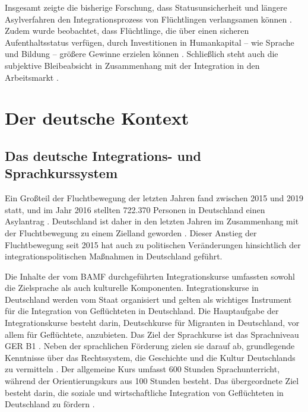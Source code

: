 Insgesamt zeigte die bisherige Forschung, dass Statusunsicherheit und längere Asylverfahren den Integrationsprozess von Flüchtlingen verlangsamen können \parencites{article}{doi:10.1126/sciadv.1600432}. Zudem wurde beobachtet, dass Flüchtlinge, die über einen sicheren Aufenthaltsstatus verfügen, durch Investitionen in Humankapital – wie Sprache und Bildung – größere Gewinne erzielen können \parencite{10.1257/aer.89.2.186}. Schließlich steht auch die subjektive Bleibeabsicht in Zusammenhang mit der Integration in den Arbeitsmarkt \parencite{doi:10.1177/09500170261425857}.



\section{Der deutsche Kontext}
\label{cha:deutsche_kontext}


\subsection{Das deutsche Integrations- und Sprachkurssystem}
\label{sec:deu-integ}

Ein Großteil der Fluchtbewegung der letzten Jahren fand zwischen 2015 und 2019 statt, und im Jahr 2016 stellten 722.370 Personen in Deutschland einen Asylantrag \parencite[13]{BAMF2020}. Deutschland ist daher in den letzten Jahren im Zusammenhang mit der Fluchtbewegung zu einem Zielland geworden \parencite{https://doi.org/10.1111/1467-9361.00008}. Dieser Anstieg der Fluchtbewegung seit 2015 hat auch zu politischen Veränderungen hinsichtlich der integrationspolitischen Maßnahmen in Deutschland geführt. 

Die Inhalte der vom BAMF durchgeführten Integrationskurse umfassten sowohl die Zielsprache als auch kulturelle Komponenten. Integrationskurse in Deutschland werden vom Staat organisiert und gelten als wichtiges Instrument für die Integration von Geflüchteten in Deutschland. Die Hauptaufgabe der Integrationskurse besteht darin, Deutschkurse für Migranten in Deutschland, vor allem für Geflüchtete, anzubieten. Das Ziel der Sprachkurse ist das Sprachniveau GER B1 \parencite{council2001common}. Neben der sprachlichen Förderung zielen sie darauf ab, grundlegende Kenntnisse über das Rechtssystem, die Geschichte und die Kultur Deutschlands zu vermitteln \parencite{Rother_2014}. Der allgemeine Kurs umfasst 600 Stunden Sprachunterricht, während der Orientierungskurs aus 100 Stunden besteht. Das übergeordnete Ziel besteht darin, die soziale und wirtschaftliche Integration von Geflüchteten in Deutschland zu fördern \parencite{Rother_2014}.

